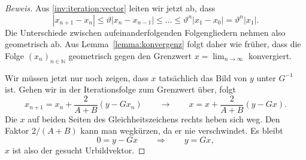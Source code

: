 \begin{proof}[Beweis]
Aus \eqref{inv:iteration:vector} leiten wir jetzt ab, dass
\[
|x_{n+1} - x_n|
\le \vartheta |x_n-x_{n-1}|
\le \dots \le \vartheta^n |x_1-x_0|=\vartheta^n |x_1|.
\]
Die Unterschiede zwischen aufeinanderfolgenden Folgengliedern
nehmen also geometrisch ab.
Aus Lemma~\ref{lemma:konvergenz} folgt daher wie früher, dass
die Folge $(x_n)_{n\in\mathbb N}$ geometrisch gegen den Grenzwert
$x=\lim_{n\to\infty}$
konvergiert.

Wir müssen jetzt nur noch zeigen, dass $x$ tatsächlich das Bild von $y$
unter $G^{-1}$ ist.
Gehen wir in der Iterationsfolge zum Grenzwert über, folgt
\[
x_{n+1} = x_n + \frac{2}{A+B}(y-Gx_n)
\qquad\rightarrow\qquad
x = x + \frac{2}{A+B}(y-Gx).
\]
Die $x$ auf beiden Seiten des Gleichheitszeichens rechts
heben sich weg.
Den Faktor $2/(A+B)$ kann man wegkürzen, da er nie verschwindet.
Es bleibt
\[
0
=
y-Gx
\qquad
\Rightarrow
\qquad
y=Gx,
\]
$x$ ist also der gesucht Urbildvektor.
\end{proof}

